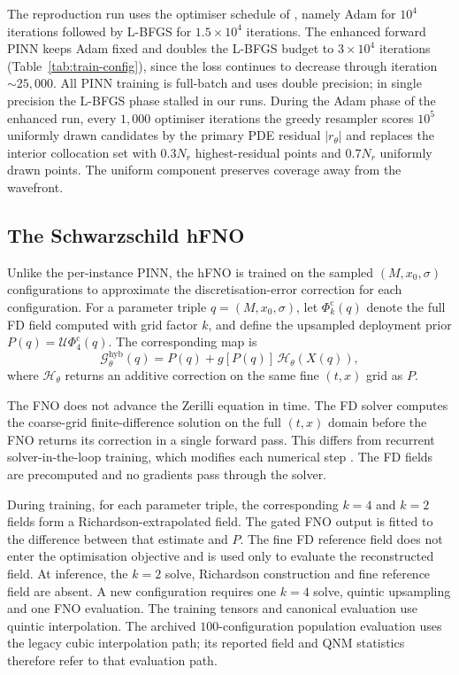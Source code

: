 The reproduction run uses the optimiser schedule of
\citet{Patel2024pinn}, namely Adam \citep{Kingma2015adam} for
$10^4$ iterations followed by L-BFGS \citep{Liu1989lbfgs} for
$1.5\times10^4$ iterations. The enhanced forward PINN keeps Adam
fixed and doubles the L-BFGS budget to $3\times10^4$ iterations
(Table~\ref{tab:train-config}), since the loss continues to decrease
through iteration $\sim 25{,}000$. All PINN training is full-batch
and uses double precision; in single precision the L-BFGS phase
stalled in our runs. During the Adam phase of the enhanced run, every
$1{,}000$ optimiser iterations the greedy resampler
\citep{Lu2021deepxde,Wu2023adaptive} scores $10^5$ uniformly drawn
candidates by the primary PDE residual $|r_\theta|$ and replaces the
interior collocation set with $0.3N_r$ highest-residual points and
$0.7N_r$ uniformly drawn points. The uniform component preserves
coverage away from the wavefront.

\subsection{The Schwarzschild hFNO}
\label{sec:hyb-method}

Unlike the per-instance PINN, the hFNO is trained on the sampled
$(M,x_0,\sigma)$ configurations to approximate the
discretisation-error correction for each configuration. For a
parameter triple
$q=(M,x_0,\sigma)$, let $\Phi_k^{\mathrm c}(q)$ denote the full FD
field computed with grid factor $k$, and define the upsampled
deployment prior $P(q)=\mathcal U\Phi_4^{\mathrm c}(q)$. The
corresponding map is
\begin{equation}
  \mathcal G_\theta^{\mathrm{hyb}}(q)
  =P(q)+g[P(q)]\,\mathcal H_\theta(X(q)),
  \label{eq:hyb-map}
\end{equation}
where $\mathcal H_\theta$ returns an additive correction on the
same fine $(t,x)$ grid as $P$.

The FNO does not advance the Zerilli equation in time. The FD solver
computes the coarse-grid finite-difference solution on the full
$(t,x)$ domain before the FNO returns its correction in a single
forward pass. This differs from
recurrent solver-in-the-loop training, which modifies each numerical
step \citep{Um2020solverloop,Kochkov2021mlcfd}. The FD fields are
precomputed and no gradients pass through the solver.

During training, for each parameter triple, the corresponding $k=4$
and $k=2$ fields form a Richardson-extrapolated field. The
gated FNO output is fitted to the difference between that estimate
and $P$. The fine FD reference field
does not enter the optimisation objective and is used only to evaluate
the reconstructed field. At inference, the $k=2$ solve, Richardson
construction and fine reference field are absent. A new configuration requires
one $k=4$ solve, quintic upsampling and one FNO evaluation.
The training tensors and canonical evaluation use quintic
interpolation. The archived $100$-configuration population evaluation
uses the legacy cubic interpolation path; its reported field and QNM
statistics therefore refer to that evaluation path.

